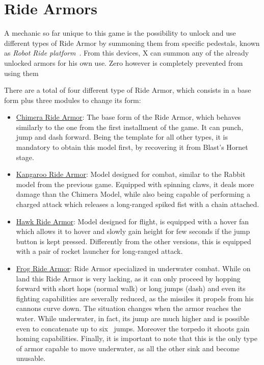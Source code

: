 \section{Ride Armors}
A mechanic so far unique to this game is the possibility to unlock and use different types of Ride Armor by summoning them from specific pedestals, known as \textit{Robot Ride platform}~\cite{X3:Manual}. From this devices, X can summon any of the already unlocked armors for his own use. Zero however is completely prevented from using them

There are a total of four different type of Ride Armor, which consists in a base form plus three modules to change its form:
\begin{itemize}
	\item \hyperlink{vehicle:Ride_Armor_Chimera}{Chimera Ride Armor}: The base form of the Ride Armor, which behaves similarly to the one from the first installment of the game. It can punch, jump and dash forward. Being the template for all other types, it is mandatory to obtain this model first, by recovering it from Blast's Hornet stage.
	\item \hyperlink{vehicle:Ride_Armor_Kangaroo}{Kangaroo Ride Armor}: Model designed for combat, similar to the Rabbit model from the previous game.  Equipped with spinning claws, it deals more damage than the Chimera Model, while also being capable of performing a  charged attack which releases a long-ranged spiked fist with a chain attached.
	\item \hyperlink{vehicle:Ride_Armor_Hawk}{Hawk Ride Armor}: Model designed for flight, is equipped with a hover fan which allows it to hover and slowly gain height for few seconds if the jump button is kept pressed. Differently from the other versions, this is equipped with a pair of rocket launcher for long-ranged attack.
	\item \hyperlink{vehicle:Ride_Armor_Frog}{Frog Ride Armor}: Ride Armor specialized in underwater combat. While on land this Ride Armor is very lacking, as it can only proceed by hopping forward with short hops (normal walk) or long jumps (dash) and even its fighting capabilities are severally reduced, as the missiles it propels from his cannons curve down. The situation changes when the armor reaches the water. While underwater, in fact, its jump are much higher and is possible even to concatenate up to six~\cite{wiki:Chimera_Armor} jumps. Moreover the torpedo it shoots gain homing capabilities. Finally, it is important to note that this is the only type of armor capable to move underwater, as all the other sink and become unusable.
\end{itemize}


